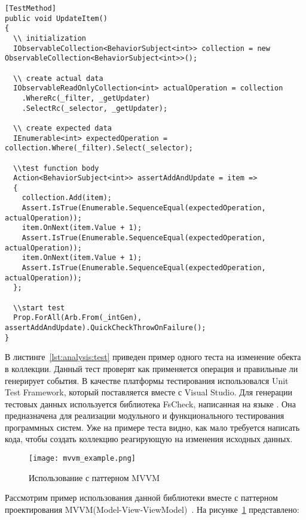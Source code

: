 \begin{lstlisting}[style=csharpinlinestyle, caption={Пример теста}, label=lst:analysis:test]
[TestMethod]
public void UpdateItem()
{
  \\ initialization
  IObservableCollection<BehaviorSubject<int>> collection = new ObservableCollection<BehaviorSubject<int>>();

  \\ create actual data
  IObservableReadOnlyCollection<int> actualOperation = collection
    .WhereRc(_filter, _getUpdater)
    .SelectRc(_selector, _getUpdater);

  \\ create expected data
  IEnumerable<int> expectedOperation = collection.Where(_filter).Select(_selector);

  \\test function body
  Action<BehaviorSubject<int>> assertAddAndUpdate = item =>
  {
    collection.Add(item);
    Assert.IsTrue(Enumerable.SequenceEqual(expectedOperation, actualOperation));
    item.OnNext(item.Value + 1);
    Assert.IsTrue(Enumerable.SequenceEqual(expectedOperation, actualOperation));
    item.OnNext(item.Value + 1);
    Assert.IsTrue(Enumerable.SequenceEqual(expectedOperation, actualOperation));
  };

  \\start test
  Prop.ForAll(Arb.From(_intGen), assertAddAndUpdate).QuickCheckThrowOnFailure();
}
\end{lstlisting}

В листинге~\ref{lst:analysis:test} приведен пример одного теста на изменение обекта в коллекции. Данный тест проверят
как применяется операция и правильные ли генерирует события. В качестве платформы тестирования использовался Unit Test Framework,
который поставляется вместе с Visual Studio. Для генерации тестовых данных используется библиотека FsCheck, написанная на языке \fsharp{}.
Она предназначена для реализации модульного и функционального тестирования программных систем. Уже на примере теста видно, как мало требуется написать кода, чтобы создать коллекцию реагирующую на изменения исходных данных.

\begin{figure}[ht]
\centering
  \texttt{[image: mvvm\_example.png]}
  \caption{ Использование с паттерном MVVM }
  \label{fig:mvvm_example}
\end{figure}

Рассмотрим пример использования данной библиотеки вместе с паттерном проектирования MVVM(Model-View-ViewModel)~\cite{mvvm_pattern}. На рисунке~\ref{fig:mvvm_example} представлено:


